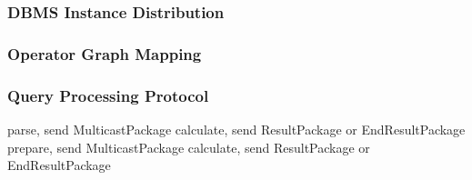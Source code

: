 \documentclass[english,10pt,xcolor=colortbl,compress]{beamer}
\begin{document}
\begin{frame}
	\frametitle{DBMS Instance Distribution}
    \begin{figure}
		\centering
	\end{figure}
\end{frame}
\begin{frame}
	\frametitle{Operator Graph Mapping}
    \begin{figure}
		\centering
	\end{figure}
\end{frame}


\begin{frame}
	\frametitle{Query Processing Protocol}
    \begin{algorithmic}
            \State parse, send MulticastPackage
                \State  calculate, send ResultPackage or EndResultPackage
            \Else
                \State  prepare, send MulticastPackage
            \EndIf
            \State calculate, send ResultPackage or EndResultPackage
        \EndIf
        \EndFunction
        
    \end{algorithmic}

    

\end{frame}
\end{document}
